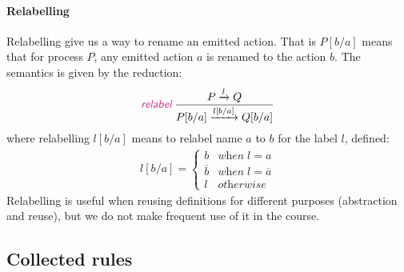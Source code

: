 \documentclass{article}
\theoremstyle{definition}
\newcommand{\trule}[1]{\textcolor{labelColor}{\textit{\textsf{#1}}}\;}
\begin{document}
\paragraph{Relabelling}

Relabelling give us a way to rename an emitted action.
That is $P [b/a]$ means that for process $P$, any emitted action $a$
is renamed to the action $b$. The semantics is given by
the reduction:
%
\begin{align*}
  \trule{relabel}
\dfrac{P \xrightarrow{l} Q}
  {P[b/a] \xrightarrow{l[b/a]} Q[b/a]}
\end{align*}
%
where relabelling $l[b/a]$ means to relabel name $a$ to $b$ for the label $l$, defined:
%
\begin{align*}
l[b/a] = \begin{cases}
b & \textit{when} \;l = a \\
\overline{b} & \textit{when} \; l = \overline{a} \\
l & \textit{otherwise}
\end{cases}
\end{align*}
%
Relabelling is useful when reusing definitions for different purposes
(abstraction and reuse), but we do not make frequent use of it in the course.

\subsection{Collected rules}
\end{document}
